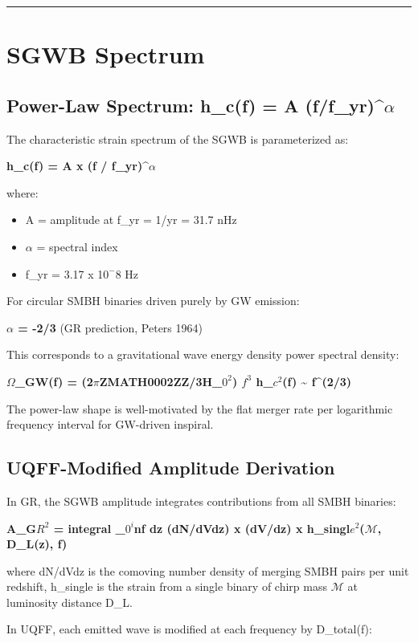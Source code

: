 \documentclass[12pt,a4paper]{article}
\begin{document}
\medskip\hrule\medskip

\section{SGWB Spectrum}

\subsection{Power-Law Spectrum: h\_c(f) = A (f/f\_yr)\^{}$\alpha$}

The characteristic strain spectrum of the SGWB is parameterized as:

\textbf{h\_c(f) = A x (f / f\_yr)\^{}$\alpha$}

where:

\begin{itemize}
  \item A = amplitude at f\_yr = 1/yr = 31.7 nHz
  \item $\alpha$ = spectral index
  \item f\_yr = 3.17 x 1$0^{-}$8 Hz
\end{itemize}

For circular SMBH binaries driven purely by GW emission:

\textbf{$\alpha$ = -2/3} (GR prediction, Peters 1964)

This corresponds to a gravitational wave energy density power spectral density:

\textbf{$\Omega$\_GW(f) = (2$\pi$ZMATH0002ZZ/3H\_$0^{2}$) $f^{3}$ h\_$c^{2}$(f) \textasciitilde{}  f\^{}(2/3)}

The power-law shape is well-motivated by the flat merger rate per logarithmic frequency interval for GW-driven inspiral.

\subsection{UQFF-Modified Amplitude Derivation}

In GR, the SGWB amplitude integrates contributions from all SMBH binaries:

\textbf{A\_G$R^{2}$ = integral \_$0^{i}$nf dz (dN/dVdz) x (dV/dz) x h\_singl$e^{2}$($\mathcal{M}$, D\_L(z), f)}

where dN/dVdz is the comoving number density of merging SMBH pairs per unit redshift, h\_single is the strain from a single binary of chirp mass $\mathcal{M}$ at luminosity distance D\_L.

In UQFF, each emitted wave is modified at each frequency by D\_total(f):
\end{document}
